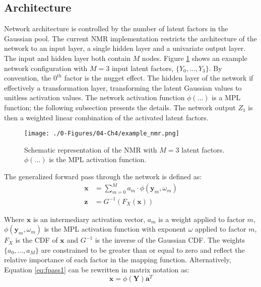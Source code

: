 \subsection{Architecture}
\label{subsec:04arch}

Network architecture is controlled by the number of latent factors in the Gaussian pool. The current \gls{NMR} implementation restricts the architecture of the network to an input layer, a single hidden layer and a univariate output layer. The input and hidden layer both contain $M$ nodes. Figure \ref{fig:example_nmr} shows an example network configuration with $M=3$ input latent factors, $\{ Y_{0}, \dots, Y_{3}\}$. By convention, the $0^{th}$ factor is the nugget effect. The hidden layer of the network if effectively a transformation layer, transforming the latent Gaussian values to unitless activation values. The network activation function $\phi(\dots)$ is a \gls{MPL} function; the following subsection presents the details. The network output $Z_{1}$ is then a weighted linear combination of the activated latent factors.

\begin{figure}[htb!]
    \centering
    \texttt{[image: ./0-Figures/04-Ch4/example\_nmr.png]}
    \caption{Schematic representation of the \gls{NMR} with $M=3$ latent factors. $\phi(\dots)$ is the \gls{MPL} activation function. }
    \label{fig:example_nmr}
\end{figure}

The generalized forward pass through the network is defined as:
\begin{align}
    \label{eq:fpass1}
    \mathbf{x} & = \sum_{m=0}^{M}a_{m} \cdot \phi(\mathbf{y}_{m}, \omega_{m}) \\
    \label{eq:fpass2}
    \mathbf{z} & = G^{-1}\left( F_{X}\left(\mathbf{x} \right)\right)
\end{align}

Where $\mathbf{x}$ is an intermediary activation vector, $a_{m}$ is a weight applied to factor $m$, $\phi(\mathbf{y}_{m}, \omega_{m})$ is the \gls{MPL} activation function with exponent $\omega$ applied to factor $m$, $F_{X}$ is the \gls{CDF} of $\mathbf{x}$ and $G^{-1}$ is the inverse of the Gaussian \gls{CDF}. The weights $\{ a_{0}, \dots, a_{M}\}$ are constrained to be greater than or equal to zero and reflect the relative importance of each factor in the mapping function. Alternatively, Equation \ref{eq:fpass1} can be rewritten in matrix notation as:
\begin{equation}
    \mathbf{x} = \phi\left( \mathbf{Y} \right) \mathbf{a}^{T}
    \label{eq:fpass3}
\end{equation}


